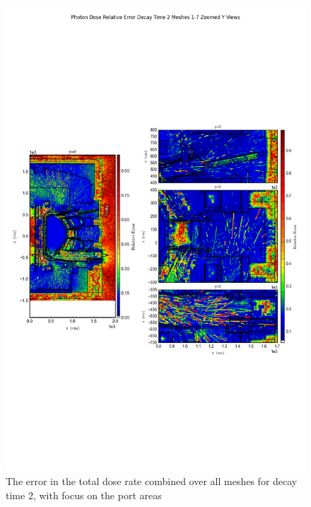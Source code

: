 \documentclass[12pt]{article}
\begin{document}
\begin{figure}[ht!]
\centering
\includegraphics[trim={0cm 9cm 0cm 10cm},clip,scale=0.75]{../plots/final_model/Photon_Dose_Relative_Error_Decay_Time_2_Meshes_1-7_Zoomed_Y_Views.png}
\caption{The error in the total dose rate combined over all meshes for decay time 2, with focus on the port areas}
\label{fig:photons_dc2_no4bc_total_error_zoomed}
\end{figure}
\clearpage
\end{document}
